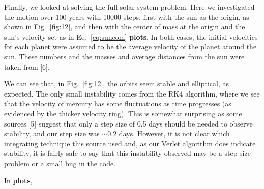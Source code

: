 \documentclass[12pt]{article}
\numberwithin{equation}{section}
\begin{document}
\par Finally, we looked at solving the full solar system problem.  Here we investigated the motion over 100 years with 10000 steps, first with the sun as the origin, as shown in Fig.~\ref{fig:12}, and then with the center of mass at the origin and the sun's velocity set as in Eq.~\ref{eq:suncom} \textbf{plots}.  In both cases, the initial velocities for each planet were assumed to be the average velocity of the planet around the sun.  These numbers and the masses and average distances from the sun were taken from [6].
\par We can see that, in Fig.~\ref{fig:12}, the orbits seem stable and elliptical, as expected.  The only small instability comes from the RK4 algorithm, where we see that the velocity of mercury has some fluctuations as time progresses (as evidenced by the thicker velocity ring).  This is somewhat surprising as some sources [5] suggest that only a step size of 0.5 days should be needed to observe stability, and our step size was $\sim0.2$ days.  However, it is not clear which integrating technique this source used and, as our Verlet algorithm does indicate stability, it is fairly safe to say that this instability observed may be a step size problem or a small bug in the code.  
\par In \textbf{plots}, 
\end{document}
